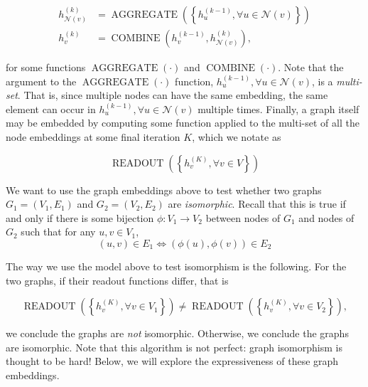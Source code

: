 \documentclass{article}
\numberwithin{figure}{section}
\begin{document}
	$$
	\begin{aligned}
		h_{\mathcal{N}(v)}^{(k)} & =\operatorname{AGGREGATE}\left(\left\{h_u^{(k-1)}, \forall u \in \mathcal{N}(v)\right\}\right) \\
		h_v^{(k)} & =\operatorname{COMBINE}\left(h_v^{(k-1)}, h_{\mathcal{N}(v)}^{(k)}\right),
	\end{aligned}
	$$
	
	\noindent for some functions $\operatorname{AGGREGATE}(\cdot)$ and $\operatorname{COMBINE}(\cdot)$. Note that the argument to the $\operatorname{AGGREGATE}(\cdot)$ function, ${h^{(k-1)}_u, \forall u \in \mathcal{N}(v)}$, is a \textit{multi-set}.
	That is, since multiple nodes can have the same embedding, the same element can occur in ${h^{(k-1)}_u, \forall u \in \mathcal{N}(v)}$ multiple times.
	Finally, a graph itself may be embedded by computing some function applied to the multi-set of all the node embeddings at some final iteration $K$, which we notate as 
	
	$$\operatorname { READOUT }\left(\left\{h_v^{(K)}, \forall v \in V\right\}\right)$$
	
	We want to use the graph embeddings above to test whether two graphs $G_1 = (V_1, E_1)$ and $G_2 = (V_2, E_2)$ are \textit{isomorphic}.
	Recall that this is true if and only if there is some bijection $\phi : V_1 \rightarrow V_2$ between nodes of $G_1$ and nodes of $G_2$ such that for any $u, v \in V_1$, 
	$$(u, v) \in E_1 \Leftrightarrow (\phi(u), \phi(v)) \in E_2$$
	
	The way we use the model above to test isomorphism is the following. For the two graphs, if their readout functions differ, that is 
	
	$$\operatorname { READOUT }\left(\left\{h_v^{(K)}, \forall v \in V_1\right\}\right) \neq \operatorname { READOUT }\left(\left\{h_v^{(K)}, \forall v \in V_2\right\}\right),$$
	
	we conclude the graphs are \textit{not} isomorphic. Otherwise, we conclude the graphs are isomorphic. Note that this algorithm is not perfect: graph isomorphism is thought to be hard! Below, we will explore the expressiveness of these graph embeddings. 
	
\end{document}
